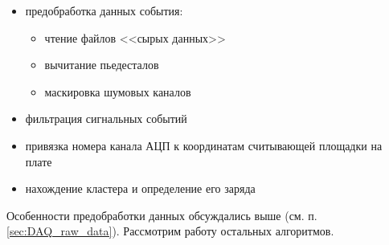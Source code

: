  \begin{itemize}
 	\item предобработка данных события:
 	\begin{itemize}[label=$\circ$]
 		\item чтение файлов <<сырых данных>>
 		\item вычитание пьедесталов
 		\item маскировка шумовых каналов
 	\end{itemize}
 	\item фильтрация сигнальных событий
 	\item привязка номера канала АЦП к координатам считывающей площадки на плате
 	\item нахождение кластера и определение его заряда
 \end{itemize}
Особенности предобработки данных обсуждались выше (см. п. \ref{sec:DAQ_raw_data}). Рассмотрим работу остальных алгоритмов.
